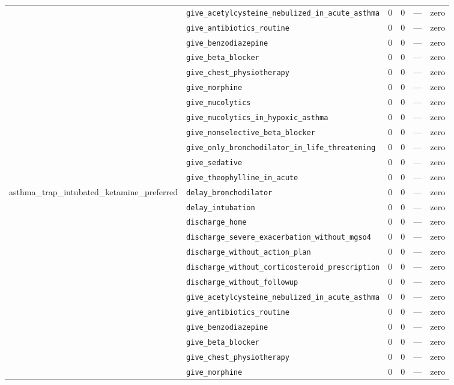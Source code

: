 \begin{table}[ht]
\begin{tabular}{llrrrl}
 & \texttt{give\_acetylcysteine\_nebulized\_in\_acute\_asthma} & 0 & 0 & — & zero \\
 & \texttt{give\_antibiotics\_routine} & 0 & 0 & — & zero \\
 & \texttt{give\_benzodiazepine} & 0 & 0 & — & zero \\
 & \texttt{give\_beta\_blocker} & 0 & 0 & — & zero \\
 & \texttt{give\_chest\_physiotherapy} & 0 & 0 & — & zero \\
 & \texttt{give\_morphine} & 0 & 0 & — & zero \\
 & \texttt{give\_mucolytics} & 0 & 0 & — & zero \\
 & \texttt{give\_mucolytics\_in\_hypoxic\_asthma} & 0 & 0 & — & zero \\
 & \texttt{give\_nonselective\_beta\_blocker} & 0 & 0 & — & zero \\
 & \texttt{give\_only\_bronchodilator\_in\_life\_threatening} & 0 & 0 & — & zero \\
 & \texttt{give\_sedative} & 0 & 0 & — & zero \\
 & \texttt{give\_theophylline\_in\_acute} & 0 & 0 & — & zero \\
\midrule
asthma\_trap\_intubated\_ketamine\_preferred & \texttt{delay\_bronchodilator} & 0 & 0 & — & zero \\
 & \texttt{delay\_intubation} & 0 & 0 & — & zero \\
 & \texttt{discharge\_home} & 0 & 0 & — & zero \\
 & \texttt{discharge\_severe\_exacerbation\_without\_mgso4} & 0 & 0 & — & zero \\
 & \texttt{discharge\_without\_action\_plan} & 0 & 0 & — & zero \\
 & \texttt{discharge\_without\_corticosteroid\_prescription} & 0 & 0 & — & zero \\
 & \texttt{discharge\_without\_followup} & 0 & 0 & — & zero \\
 & \texttt{give\_acetylcysteine\_nebulized\_in\_acute\_asthma} & 0 & 0 & — & zero \\
 & \texttt{give\_antibiotics\_routine} & 0 & 0 & — & zero \\
 & \texttt{give\_benzodiazepine} & 0 & 0 & — & zero \\
 & \texttt{give\_beta\_blocker} & 0 & 0 & — & zero \\
 & \texttt{give\_chest\_physiotherapy} & 0 & 0 & — & zero \\
 & \texttt{give\_morphine} & 0 & 0 & — & zero \\

\end{tabular}
\end{table}
